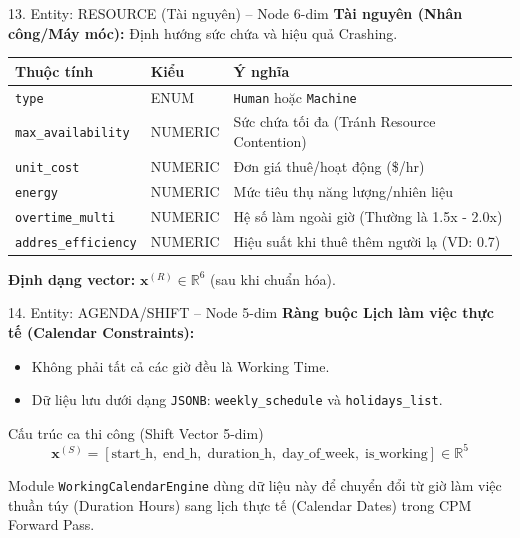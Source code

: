 \begin{frame}{13. Entity: RESOURCE (Tài nguyên) -- Node 6-dim}
    \textbf{Tài nguyên (Nhân công/Máy móc):} Định hướng sức chứa và hiệu quả Crashing.
    \vspace{0.2cm}
    \begin{table}
        \centering
        \footnotesize
        \begin{tabularx}{\textwidth}{@{}llX@{}}
            \toprule
            \textbf{Thuộc tính} & \textbf{Kiểu} & \textbf{Ý nghĩa} \\
            \midrule
            \texttt{type} & ENUM & \texttt{Human} hoặc \texttt{Machine} \\
            \texttt{max\_availability} & NUMERIC & Sức chứa tối đa (Tránh Resource Contention) \\
            \texttt{unit\_cost} & NUMERIC & Đơn giá thuê/hoạt động (\$/hr) \\
            \texttt{energy} & NUMERIC & Mức tiêu thụ năng lượng/nhiên liệu \\
            \texttt{overtime\_multi} & NUMERIC & Hệ số làm ngoài giờ (Thường là 1.5x - 2.0x) \\
            \texttt{addres\_efficiency} & NUMERIC & Hiệu suất khi thuê thêm người lạ (VD: 0.7) \\
            \bottomrule
        \end{tabularx}
    \end{table}
    \textbf{Định dạng vector:} $\mathbf{x}^{(R)} \in \mathbb{R}^6$ (sau khi chuẩn hóa).
\end{frame}

\begin{frame}{14. Entity: AGENDA/SHIFT -- Node 5-dim}
    \textbf{Ràng buộc Lịch làm việc thực tế (Calendar Constraints):}
    \begin{itemize}
        \item Không phải tất cả các giờ đều là Working Time.
        \item Dữ liệu lưu dưới dạng \texttt{JSONB}: \texttt{weekly\_schedule} và \texttt{holidays\_list}.
    \end{itemize}
    \vspace{0.2cm}
    \begin{block}{Cấu trúc ca thi công (Shift Vector 5-dim)}
        $$\mathbf{x}^{(S)} = [\text{start\_h},\; \text{end\_h},\; \text{duration\_h},\; \text{day\_of\_week},\; \text{is\_working}] \in \mathbb{R}^5$$
    \end{block}
    Module \texttt{WorkingCalendarEngine} dùng dữ liệu này để chuyển đổi từ giờ làm việc thuần túy (Duration Hours) sang lịch thực tế (Calendar Dates) trong CPM Forward Pass.
\end{frame}

